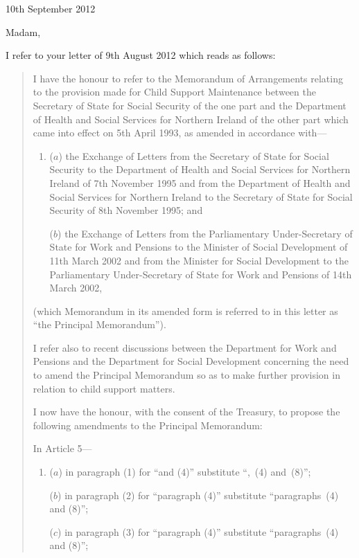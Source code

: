 \documentclass[12pt,a4paper]{article}
\begin{document}
10th September 2012

Madam,

I refer to your letter of 9th August 2012 which reads as follows:
\begin{quotation}
I have the honour to refer to the Memorandum of Arrangements relating to the 
provision made for Child Support Maintenance between the Secretary of State for
Social Security of the one part and the Department of Health and Social Services for
Northern Ireland of the other part which came into effect on 5th April 1993, as
amended in accordance with---
\begin{enumerate}\item[]
($a$) the Exchange of Letters from the Secretary of State for Social Security to the Department of Health and Social Services for Northern Ireland of 7th November 1995 and from the Department of Health and Social Services for Northern Ireland to the Secretary of State for Social Security of 8th November 1995; and

($b$) the Exchange of Letters from the Parliamentary Under-Secretary of State for Work and Pensions to the Minister of Social Development of 11th March 2002 and from the Minister for Social Development to the Parliamentary Under-Secretary of State for Work and Pensions of 14th March 2002,
\end{enumerate}
(which Memorandum in its amended form is referred to in this letter as ``the Principal Memorandum'').

I refer also to recent discussions between the Department for Work and Pensions and the Department for Social Development concerning the need to amend the Principal Memorandum so as to make further provision in relation to child support matters.

I now have the honour, with the consent of the Treasury, to propose the following amendments to the Principal Memorandum:

In Article 5---
\begin{enumerate}\item[]
($a$) in paragraph (1) for ``and (4)'' substitute ``,~(4) and~(8)'';

\begin{sloppypar}
($b$) in paragraph (2) for ``paragraph (4)'' substitute ``paragraphs~(4) and (8)'';
\end{sloppypar}

\begin{sloppypar}
($c$) in paragraph (3) for ``paragraph (4)'' substitute ``paragraphs~(4) and (8)'';
\end{sloppypar}


\end{enumerate}
\end{quotation}
\end{document}
